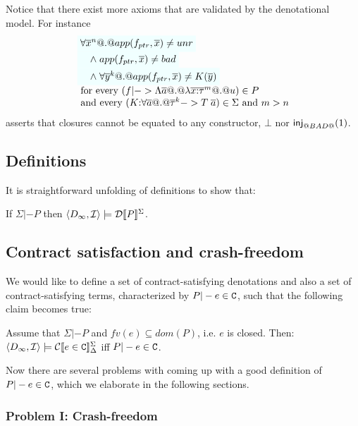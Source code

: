 \documentclass[preprint,nocopyrightspace,draft]{sigplanconf}
\begin{document}
Notice that there exist more axioms that are validated by the denotational model. For instance 
\[\begin{array}{l}
    \formula{\forall \oln{x}{n} @.@ app(f_{ptr},\xs) \neq \unr} \\
    \formula{\quad\land\; app(f_{ptr},\xs) \neq \bad} \\
    \formula{\quad\land\; \forall \oln{y}{k} @.@ app(f_{ptr},\xs) \neq K(\ol{y})} \\
    \text{ for every } (f |-> \Lambda\as @.@ \lambda\oln{x{:}\tau}{m} @.@ u) \in P  \\
    \text{ and every } (K{:}\forall\as @.@ \oln{\tau}{k} -> T\;\as) \in \Sigma \text{ and } m > n 
\end{array}\]
asserts that closures cannot be equated to any constructor, $\bot$ nor $\mathsf{inj}_{@BAD@}(1)$.


\subsection{Definitions}\label{sect:defs} 

It is straightforward unfolding of definitions to show that:

\begin{theorem}
If $\Sigma |- P$ then $\langle D_{\infty},{\cal I}\rangle \models {\cal D}[\![P]\!]^{\Sigma}$. 
\end{theorem}


\subsection{Contract satisfaction and crash-freedom}\label{sect:cf}
\newcommand{\Fcf}{F_{\lcfZ}} 

We would like to define a set of contract-satisfying denotations and also a set of contract-satisfying terms, 
characterized by $P |- e \in {\tt C}$, such that the following claim becomes true:

\begin{proposition} Assume that $\Sigma |- P$ and $fv(e) \subseteq dom(P)$, i.e. $e$ is closed.
Then: $\langle D_\infty,{\cal I}\rangle \models {\cal C}[\![e \in {\tt C}]\!]_{\Delta}^{\Sigma}$ iff $P |- e \in {\tt C}$.
\end{proposition}

Now there are several problems with coming up with a good definition of $P |- e \in {\tt C}$, 
which we elaborate in the following sections.

\subsubsection{Problem I: Crash-freedom} 
\end{document}
